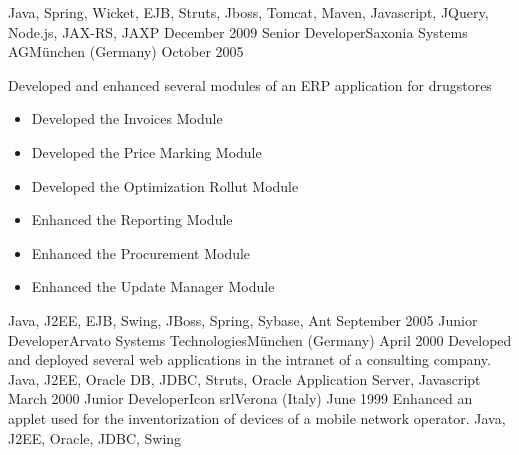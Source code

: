 \begin{experiences}
{                    }
                    {Java, Spring, Wicket, EJB, Struts, Jboss, Tomcat, Maven, Javascript, JQuery, Node.js, JAX-RS, JAXP}
  \emptySeparator
  \experience
  {December 2009}   {Senior Developer}{Saxonia Systems AG}{München (Germany)}
  {October 2005}    {
  					    Developed and enhanced several modules of an ERP application for drugstores
  					    \begin{itemize}
                        	\item Developed the Invoices Module
							\item Developed the Price Marking Module
							\item Developed the Optimization Rollut Module
                        	\item Enhanced the Reporting Module
                        	\item Enhanced the Procurement Module
    						\item Enhanced the Update Manager Module
                    	\end{itemize}
  					 }
                    {Java, J2EE, EJB, Swing, JBoss, Spring, Sybase, Ant}
  \emptySeparator
  \consultantexperience
  {September 2005}   {Junior Developer}{Arvato Systems Technologies}{München (Germany)}
  {April 2000}       {
                     	  Developed and deployed several web applications in the intranet of a consulting company.
                     }
                     {Java, J2EE, Oracle DB, JDBC, Struts, Oracle Application Server, Javascript}
  \emptySeparator
  \consultantexperience
  {March 2000}  	{Junior Developer}{Icon srl}{Verona (Italy)}
  {June 1999}   	{ 
  				 		Enhanced an applet used for the inventorization of devices of a mobile network operator.
  				 	}
                	{Java, J2EE, Oracle, JDBC, Swing} 
\end{experiences}


